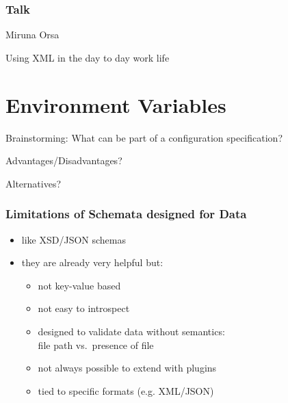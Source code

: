 \begin{frame}
	\frametitle{Talk}
	Miruna Orsa

	Using XML in the day to day work life
\end{frame}



\section{Environment Variables}

\begin{assignment}
	\begin{task}
	Brainstorming: What can be part of a configuration specification?
	\end{task}

	\begin{task}
	Advantages/Disadvantages?
	\end{task}

	\begin{task}
	Alternatives?
	\end{task}
\end{assignment}

\begin{frame}
	\methodQuestion{}
\end{frame}

\begin{frame}
	\frametitle{Limitations of Schemata designed for Data}
	\begin{itemize}
	\item like XSD/JSON schemas
	\item they are already very helpful but:
	\pause
	\begin{itemize}
	\item not key-value based
	\item not easy to introspect
	\item designed to validate data without semantics: \\ file path vs.\ presence of file
	\item not always possible to extend with plugins
	\item tied to specific formats (e.g. XML/JSON)
	\end{itemize}
	\end{itemize}
\end{frame}


